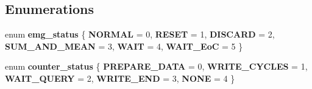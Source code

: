\subsection*{Enumerations}
\begin{DoxyCompactItemize}
\item 
enum \textbf{ emg\+\_\+status} \{ \newline
\textbf{ N\+O\+R\+M\+AL} = 0, 
\textbf{ R\+E\+S\+ET} = 1, 
\textbf{ D\+I\+S\+C\+A\+RD} = 2, 
\textbf{ S\+U\+M\+\_\+\+A\+N\+D\+\_\+\+M\+E\+AN} = 3, 
\newline
\textbf{ W\+A\+IT} = 4, 
\textbf{ W\+A\+I\+T\+\_\+\+EoC} = 5
 \}
\item 
enum \textbf{ counter\+\_\+status} \{ \newline
\textbf{ P\+R\+E\+P\+A\+R\+E\+\_\+\+D\+A\+TA} = 0, 
\textbf{ W\+R\+I\+T\+E\+\_\+\+C\+Y\+C\+L\+ES} = 1, 
\textbf{ W\+A\+I\+T\+\_\+\+Q\+U\+E\+RY} = 2, 
\textbf{ W\+R\+I\+T\+E\+\_\+\+E\+ND} = 3, 
\newline
\textbf{ N\+O\+NE} = 4
 \}
\end{DoxyCompactItemize}
